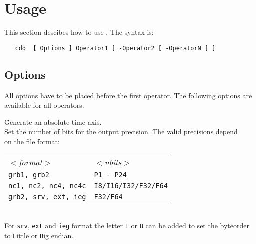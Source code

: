 \section{Usage}

This section descibes how to use {\CDO}.
The syntax is:
\begin{verbatim}
   cdo  [ Options ] Operator1 [ -Operator2 [ -OperatorN ] ]
\end{verbatim}


\subsection{Options}

All options have to be placed before the first operator.
The following options are available for all operators:

\begin{tabbing}
         \= Generate an absolute time axis. \\
         \> Set the number of bits for the output precision. The valid precisions depend \\
         \> on the file format:\\
         \> \parbox[r]{3in}{
              \vspace*{1mm}
              \hspace*{0cm}\begin{tabular}{|l|l|}
              \hline
              \rowcolor{pcolor2}
                \sl $<$format$>$ & \sl $<$nbits$>$ \\
                {\tt grb1, grb2}           & {\tt P1 - P24}              \\
                {\tt nc1, nc2, nc4, nc4c}  & {\tt I8/I16/I32/F32/F64}  \\
                {\tt grb2, srv, ext, ieg}       & {\tt F32/F64}             \\
              \hline
              \end{tabular}
              \vspace*{1mm}
            } \\
         \> For {\tt srv}, {\tt ext} and {\tt ieg} format the letter {\tt L} or {\tt B} can be added to set the byteorder \\
         \> to {\tt L}ittle or {\tt B}ig endian. \\

\end{tabbing}
